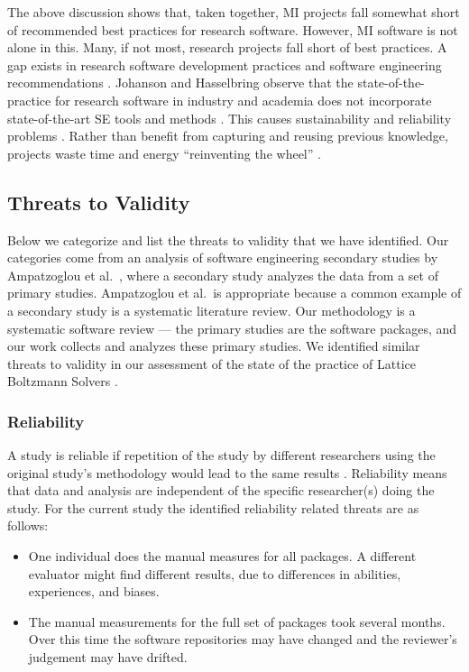 \documentclass[11pt]{article}
\begin{document}
The above discussion shows that, taken together, MI projects fall somewhat short
of recommended best practices for research software.  However, MI software is
not alone in this.  Many, if not most, research projects fall short of best
practices.  A gap exists in research software development practices and software
engineering recommendations \cite{Storer2017, Kelly2007, OwojaiyeEtAl2021_CSE}.
Johanson and Hasselbring observe that the state-of-the-practice for research
software in industry and academia does not incorporate state-of-the-art SE tools
and methods \cite{JohansonAndHasselbring2018}.  This causes sustainability and
reliability problems \cite{FaulkEtAl2009}. Rather than benefit from capturing
and reusing previous knowledge, projects waste time and energy ``reinventing the
wheel'' \cite{deSouzaEtAl2019}.

\subsection{Threats to Validity} \label{sec_threats_to_validity}

Below we categorize and list the threats to validity that we have identified.
Our categories come from an analysis of software engineering secondary studies
by Ampatzoglou et al.\ \cite{AmpatzoglouEtAl2019}, where a secondary study
analyzes the data from a set of primary studies.  Ampatzoglou et al.\ is
appropriate because a common example of a secondary study is a systematic
literature review. Our methodology is a systematic software review --- the
primary studies are the software packages, and our work collects and analyzes
these primary studies.  We identified similar threats to validity in our
assessment of the state of the practice of Lattice Boltzmann Solvers
\cite{SmithEtAl2024}.

\subsubsection{Reliability}

A study is reliable if repetition of the study by different researchers using
the original study's methodology would lead to the same results
\cite{RunesonAndHost2009}. Reliability means that data and analysis are
independent of the specific researcher(s) doing the study.  For the current
study the identified reliability related threats are as follows:

\begin{itemize}
\item One individual does the manual measures for all packages. A different
evaluator might find different results, due to differences in abilities,
experiences, and biases.
\item The manual measurements for the full set of packages took several months.
Over this time the software repositories may have changed and the reviewer's
judgement may have drifted.
\end{itemize}
\end{document}
